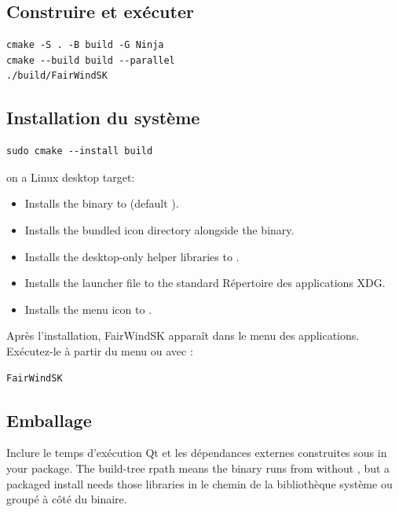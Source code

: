 \subsection{Construire et exécuter}

\begin{lstlisting}
cmake -S . -B build -G Ninja
cmake --build build --parallel
./build/FairWindSK
\end{lstlisting}

\subsection{Installation du système}

\begin{lstlisting}
sudo cmake --install build
\end{lstlisting}

 on a Linux desktop target:

\begin{itemize}
  \item Installs the  binary to
         (default ).
  \item Installs the bundled icon directory alongside the binary.
  \item Installs the desktop-only helper libraries to
        .
  \item Installs the  launcher file to the standard
Répertoire des applications XDG.
  \item Installs the  menu icon to
        .
\end{itemize}

Après l'installation, FairWindSK apparaît dans le menu des applications.
Exécutez-le à partir du menu ou avec :

\begin{lstlisting}
FairWindSK
\end{lstlisting}

\subsection{Emballage}

Inclure le temps d'exécution Qt et les dépendances externes construites sous
 in your package.
The build-tree rpath means the binary runs from  without
, but a packaged install needs those libraries in
le chemin de la bibliothèque système ou groupé à côté du binaire.


